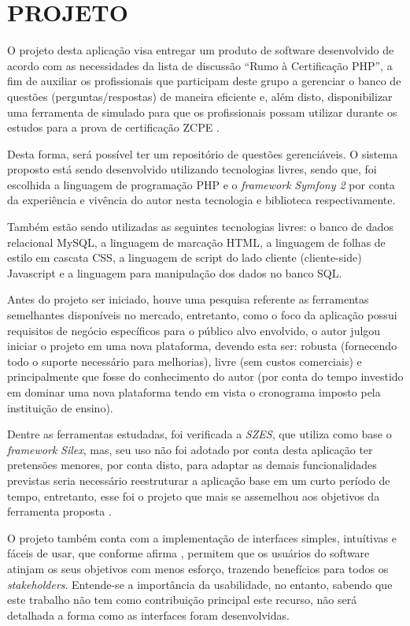 \chapter{PROJETO}
\label{chp:projeto}

O projeto desta aplicação visa entregar um produto de software
desenvolvido de acordo com as necessidades da lista de discussão ``Rumo à
Certificação PHP'', a fim de auxiliar os profissionais que participam deste
grupo a gerenciar o banco de questões (perguntas/respostas) de maneira eficiente e,
além disto, disponibilizar uma ferramenta de simulado para que os profissionais 
possam utilizar durante os estudos para a prova de certificação \acs{ZCPE}
\cite{googleGroupsRumoACertificaoPHP}.

Desta forma, será possível ter um repositório de questões gerenciáveis. O
sistema proposto está sendo desenvolvido utilizando tecnologias livres, sendo 
que, foi escolhida a linguagem de programação \acs{PHP} e o
\textit{framework} \textit{Symfony 2} por conta da experiência e vivência do
autor nesta tecnologia e biblioteca respectivamente.

Também estão sendo utilizadas as seguintes tecnologias livres: o banco de dados
relacional MySQL, a linguagem de marcação HTML, a linguagem de folhas de estilo 
em cascata CSS,  a linguagem de script do lado cliente (cliente-side) Javascript 
e a linguagem para manipulação dos dados no banco SQL.

Antes do projeto ser iniciado, houve uma pesquisa referente as ferramentas
semelhantes disponíveis no mercado, entretanto, como o foco da aplicação possui
requisitos de negócio específicos para o público alvo envolvido, o autor julgou
iniciar o projeto em uma nova plataforma, devendo esta ser: robusta (fornecendo
todo o suporte necessário para melhorias), livre (sem custos comerciais) e
principalmente que fosse do conhecimento do autor (por conta do tempo investido
em dominar uma nova plataforma tendo em vista o cronograma imposto pela
instituição de ensino).

Dentre as ferramentas estudadas, foi
verificada a \textit{SZES}, que utiliza como base o \textit{framework}
\textit{Silex}, mas, seu uso não foi adotado por conta desta aplicação
ter pretensões menores, por conta disto, para adaptar as demais funcionalidades
previstas seria necessário reestruturar a aplicação
base em um curto período de tempo, entretanto, esse foi o projeto que mais se
assemelhou aos objetivos da ferramenta proposta \cite{githubSZES}.

O projeto também conta com a implementação de interfaces simples, intuítivas e
fáceis de usar, que conforme afirma , permitem
que os usuários do software atinjam os seus objetivos com menos esforço,
trazendo benefícios para todos os \textit{stakeholders}. Entende-se a
importância da usabilidade, no entanto, sabendo que este trabalho não tem como
contribuição principal este recurso, não será detalhada a forma como as
interfaces foram desenvolvidas.

